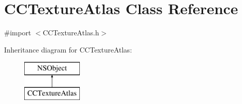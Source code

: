 \hypertarget{interface_c_c_texture_atlas}{\section{C\-C\-Texture\-Atlas Class Reference}
\label{interface_c_c_texture_atlas}
}


{\ttfamily \#import $<$C\-C\-Texture\-Atlas.\-h$>$}

Inheritance diagram for C\-C\-Texture\-Atlas\-:\begin{figure}[H]
\begin{center}
\leavevmode
\includegraphics[height=2.000000cm]{interface_c_c_texture_atlas}
\end{center}
\end{figure}

